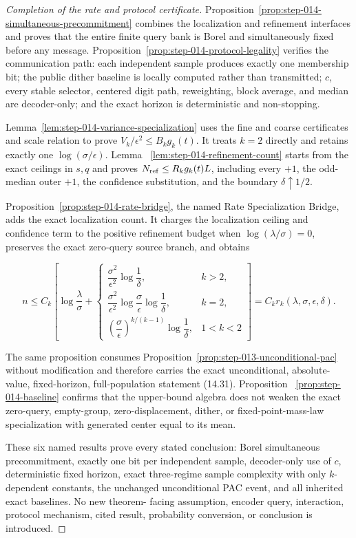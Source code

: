 \begin{proof}[Completion of the rate and protocol certificate]
Proposition~\ref{prop:step-014-simultaneous-precommitment} combines the
localization and refinement interfaces and proves that the entire
finite query bank is Borel and simultaneously fixed before any message.
Proposition~\ref{prop:step-014-protocol-legality} verifies the communication
path: each independent sample produces exactly one membership bit; the
public dither baseline is locally computed rather than transmitted; \(c\),
every stable selector, centered digit path, reweighting, block average, and
median are decoder-only; and the exact horizon is deterministic and
non-stopping.

Lemma~\ref{lem:step-014-variance-specialization} uses the fine
and coarse certificates and scale relation to prove
\(V_k/\epsilon^2\leq B_kg_k(t)\). It treats \(k=2\) directly and retains
exactly one \(\log(\sigma/\epsilon)\). Lemma~
\ref{lem:step-014-refinement-count} starts from the exact ceilings in \(s,q\) and proves \(N_{\rm ref}\leq R_kg_k(t)L\), including
every \(+1\), the odd-median outer \(+1\), the confidence substitution, and
the boundary \(\delta\uparrow1/2\).

Proposition~\ref{prop:step-014-rate-bridge}, the named Rate
Specialization Bridge, adds the exact localization count. It charges the
localization ceiling and confidence term to the positive refinement budget
when \(\log(\lambda/\sigma)=0\), preserves the exact zero-query source
branch, and obtains

\[
n\leq C_k\left[
\log\frac\lambda\sigma+
\begin{cases}
\dfrac{\sigma^2}{\epsilon^2}\log\dfrac1\delta,&k>2,\\[0.5em]
\dfrac{\sigma^2}{\epsilon^2}
\log\dfrac\sigma\epsilon\log\dfrac1\delta,&k=2,\\[0.5em]
\left(\dfrac\sigma\epsilon\right)^{k/(k-1)}
\log\dfrac1\delta,&1<k<2
\end{cases}
\right]
=C_kr_k(\lambda,\sigma,\epsilon,\delta).
\tag{14.38}
\]

The same proposition consumes Proposition~\ref{prop:step-013-unconditional-pac} without modification and
therefore carries the exact unconditional, absolute-value, fixed-horizon,
full-population statement (14.31). Proposition~
\ref{prop:step-014-baseline} confirms that the upper-bound algebra does
not weaken the exact zero-query, empty-group, zero-displacement, dither, or
fixed-point-mass-law specialization with generated center equal to its mean.

These six named results prove every stated conclusion:
Borel simultaneous precommitment, exactly one bit per independent sample,
decoder-only use of \(c\), deterministic fixed horizon, exact three-regime
sample complexity with only \(k\)-dependent constants, the unchanged
unconditional PAC event, and all inherited exact baselines. No new theorem-
facing assumption, encoder query, interaction, protocol mechanism, cited
result, probability conversion, or conclusion is introduced.
\end{proof}

